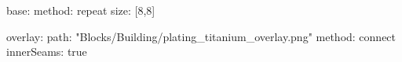 base:
  method: repeat
  size: [8,8]

overlay:
  path: "Blocks/Building/plating_titanium_overlay.png"
  method: connect
  innerSeams: true
